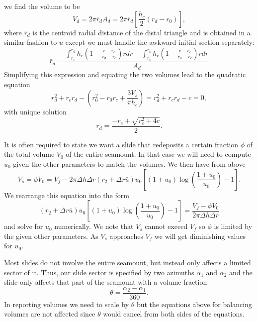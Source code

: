 \documentclass[12pt,letterpaper,margin=0.5in]{report}
\begin{document}
we find the volume to be
\begin{equation}
V_d = 2 \pi \bar{r}_d A_d = 2 \pi \bar{r}_d \left [ \frac{h_c}{2} (r_d - r_0) \right ],
\end{equation}
where $\bar{r}_d$ is the centroid radial distance of the distal triangle and is obtained in a similar fashion to $\bar{u}$ except
we must handle the awkward initial section separately:
\begin{equation}
\bar{r}_d = \frac{\int_{r_c}^{r_d}h_c \left (1 - \frac{r - r_c}{r_d - r_c} \right )rdr - \int_{r_c}^{r_o}h_c \left (1 - \frac{r - r_c}{r_o- r_c} \right )rdr}{A_d}
\end{equation}
Simplifying this expression and equating the two volumes lead to the quadratic equation
\begin{equation}
r_d^2 + r_c r_d - \left (r_0^2 - r_0 r_c + \frac{3 V_s}{\pi h_c}\right ) = r_d^2 + r_c r_d - c = 0,
\end{equation}
with unique solution
\begin{equation}
r_d = \frac{-r_c + \sqrt{r_c^2 + 4c}}{2}.
\end{equation}

It is often required to state we want a slide that redeposits a certain fraction $\phi$ of the total volume $V_0$ of the entire seamount. In that
case we will need to compute $u_0$ given the other parameters to match the volumes.  We then have from above
\begin{equation}
V_s = \phi V_0 = V_f - 2 \pi \Delta h \Delta r \left ( r_2 + \Delta r\bar{u} \right ) u_0 \left [ (1 + u_0) \log \left (\frac{1 + u_0}{u_0} \right ) - 1 \right ].
\end{equation}
We rearrange this equation into the form
\begin{equation}
\left ( r_2 + \Delta r \bar{u} \right ) u_0 \left [ (1 + u_0) \log \left (\frac{1 + u_0}{u_0} \right ) - 1 \right ] = \frac{V_f - \phi V_0}{2 \pi \Delta h \Delta r}
\end{equation}
and solve for $u_0$ numerically.  We note that $V_s$ cannot exceed $V_f$ so $\phi$ is limited by the given other parameters.  As
$V_s$ approaches $V_f$ we will get diminishing values for $u_0$.

Most slides do not involve the entire seamount, but instead only affects a limited sector of it.  Thus, our slide sector is specified by two
azimuths $\alpha_1$ and $\alpha_2$ and the slide only affects that part of the seamount with a volume fraction
\begin{equation}
\theta = \frac{\alpha_2 - \alpha_1}{360}.
\end{equation}
In reporting volumes we need to scale by $\theta$ but the equations above for balancing volumes are not affected since $\theta$ would cancel from both sides of the equations.
\end{document}
